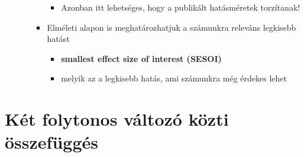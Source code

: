 \documentclass[
  letterpaper,
  DIV=11,
  numbers=noendperiod]{scrreprt}
\providecommand{\tightlist}{%
  \setlength{\itemsep}{0pt}\setlength{\parskip}{0pt}}\usepackage{longtable,booktabs,array}
\begin{document}
\begin{itemize}
\begin{itemize}
\begin{itemize}
      \begin{itemize}
      \tightlist
      \item
        Azonban itt lehetséges, hogy a publikált hatásméretek
        torzítanak!
      \end{itemize}
    \item
      Elméleti alapon is meghatározhatjuk a számunkra releváns legkisebb
      hatást

      \begin{itemize}
      \tightlist
      \item
        \textbf{smallest effect size of interest (SESOI)}
      \item
        melyik az a legkisebb hatás, ami számunkra még érdekes lehet
      \end{itemize}
    \end{itemize}
  \end{itemize}
\end{itemize}


\hypertarget{kuxe9t-folytonos-vuxe1ltozuxf3-kuxf6zti-uxf6sszefuxfcgguxe9s}{%
\chapter{Két folytonos változó közti
összefüggés}\label{kuxe9t-folytonos-vuxe1ltozuxf3-kuxf6zti-uxf6sszefuxfcgguxe9s}}
\end{document}
